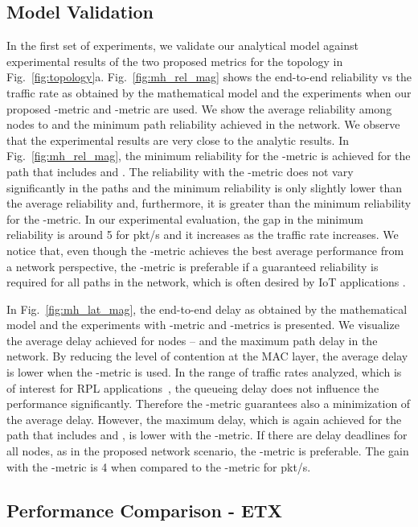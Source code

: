 \documentclass[review, 1p, 11pt]{elsarticle}
\numberwithin{equation}{section}
\begin{document}
\subsection{Model Validation}

In the first set of experiments, we validate our analytical model against experimental results of the two proposed metrics for the topology in Fig.~\ref{fig:topology}a.
Fig.~\ref{fig:mh_rel_mag} shows the end-to-end reliability vs the traffic rate as obtained
by the mathematical model and the experiments when our proposed -metric and -metric are used.
We show the average reliability among nodes  to  and
the minimum path reliability achieved in the network. We observe that the experimental results are very close to the analytic results.
In Fig.~\ref{fig:mh_rel_mag}, the minimum reliability for the -metric is achieved for the path that includes  and .
The reliability with the -metric does not vary significantly in the paths and the minimum reliability is only slightly lower than the average reliability and, furthermore, it is greater than the minimum reliability for the -metric. In our experimental evaluation, the gap in the minimum reliability is around 5 for  pkt/s and it increases as the traffic rate increases. We notice that, even though the -metric achieves the best average performance from a network perspective, the -metric is preferable if a guaranteed reliability is required for all paths in the network, which is often desired by IoT applications \cite{palattella_iot}.

In Fig.~\ref{fig:mh_lat_mag}, the end-to-end delay as obtained
by the mathematical model and the experiments with -metric and -metrics is presented.
We visualize the average delay achieved for nodes -- and
the maximum path delay in the network.
By reducing the level of contention at the MAC layer, the average delay is lower when the -metric is used.
In the range of traffic rates analyzed, which is of interest for RPL applications~\cite{ROLL}, the queueing delay does not influence the performance significantly. Therefore the -metric guarantees also a minimization of the average delay. However, the maximum delay, which is again achieved  for the path that includes  and ,  is lower with the -metric.  If there are delay deadlines for all nodes, as in the proposed network scenario, the -metric is preferable. The gain with the -metric is 4 when compared to the -metric for   pkt/s.



\subsection{Performance Comparison - ETX}
\end{document}
